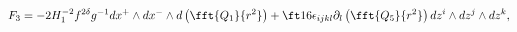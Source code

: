 \begin{equation}
F_3=-2H_1^{-2}f^{2\delta}g^{-1}dx^+\wedge dx^-\wedge
d\left(\fft{Q_1}{r^2}\right)
+\ft16\epsilon_{ijkl}\partial_l\left(\fft{Q_5}{r^2}\right)dz^i\wedge
dz^j\wedge dz^k,
\end{equation}

